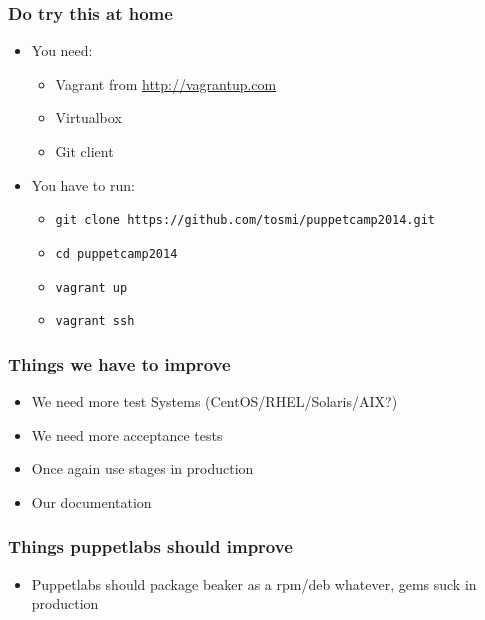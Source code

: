 \documentclass{beamer}
\begin{document}
\begin{frame}
\end{frame}

\begin{frame}
  \frametitle{Do try this at home}

  \begin{itemize}
  \item You need:
    \begin{itemize}
    \item Vagrant from \url{http://vagrantup.com}
    \item Virtualbox
    \item Git client
    \end{itemize}
  \item You have to run:
    \begin{itemize}
    \item \texttt{git clone https://github.com/tosmi/puppetcamp2014.git}
    \item \texttt{cd puppetcamp2014}
    \item \texttt{vagrant up}
    \item \texttt{vagrant ssh}
    \end{itemize}
  \end{itemize}
\end{frame}

\begin{frame}
  \frametitle{Things we have to improve}

  \begin{itemize}
  \item We need more test Systems (CentOS/RHEL/Solaris/AIX?)
  \item We need more acceptance tests
  \item Once again use stages in production
  \item Our documentation
  \end{itemize}
\end{frame}

\begin{frame}
  \frametitle{Things puppetlabs should improve }
  \begin{itemize}
  \item Puppetlabs should package beaker as a rpm/deb whatever, gems
    suck in production
  \end{itemize}

\end{frame}
\end{document}
